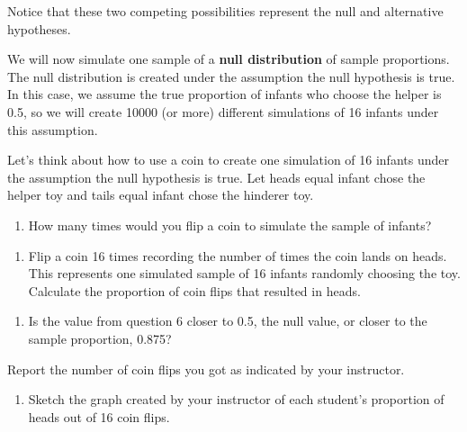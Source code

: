 \documentclass[
]{report}
\providecommand{\tightlist}{%
  \setlength{\itemsep}{0pt}\setlength{\parskip}{0pt}}
\begin{document}
Notice that these two competing possibilities represent the null and alternative hypotheses.

We will now simulate one sample of a \textbf{null distribution} of sample proportions. The null distribution is created under the assumption the null hypothesis is true. In this case, we assume the true proportion of infants who choose the helper is 0.5, so we will create 10000 (or more) different simulations of 16 infants under this assumption.

Let's think about how to use a coin to create one simulation of 16 infants under the assumption the null hypothesis is true. Let heads equal infant chose the helper toy and tails equal infant chose the hinderer toy.

\begin{enumerate}
\def\labelenumi{\arabic{enumi}.}
\setcounter{enumi}{4}
\tightlist
\item
  How many times would you flip a coin to simulate the sample of infants?
\end{enumerate}

\vspace{0.2in}

\begin{enumerate}
\def\labelenumi{\arabic{enumi}.}
\setcounter{enumi}{5}
\tightlist
\item
  Flip a coin 16 times recording the number of times the coin lands on heads. This represents one simulated sample of 16 infants randomly choosing the toy. Calculate the proportion of coin flips that resulted in heads.
\end{enumerate}

\vspace{0.2in}

\begin{enumerate}
\def\labelenumi{\arabic{enumi}.}
\setcounter{enumi}{6}
\tightlist
\item
  Is the value from question 6 closer to 0.5, the null value, or closer to the sample proportion, 0.875?
\end{enumerate}

\vspace{0.2in}

Report the number of coin flips you got as indicated by your instructor.

\begin{enumerate}
\def\labelenumi{\arabic{enumi}.}
\setcounter{enumi}{7}
\tightlist
\item
  Sketch the graph created by your instructor of each student's proportion of heads out of 16 coin flips.
\end{enumerate}
\end{document}
